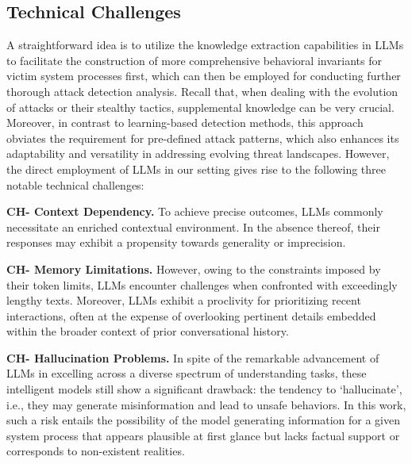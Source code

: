 \subsection{Technical Challenges}\label{sec:challenges}
A straightforward idea is to utilize the knowledge extraction capabilities in LLMs to facilitate the construction of more comprehensive behavioral invariants for victim system processes first, which can then be employed for conducting further thorough attack detection analysis. Recall that,
when dealing with the evolution of attacks or their stealthy tactics, supplemental knowledge can be very crucial. Moreover, in contrast to learning-based detection methods, this approach obviates the requirement for pre-defined attack patterns, which also enhances its adaptability and versatility in addressing evolving threat landscapes.
However, the direct employment of LLMs in our setting gives rise to the following three notable technical challenges:


\noindent
{\bf CH- Context Dependency.} %
To achieve precise outcomes, LLMs commonly necessitate an enriched contextual environment. In the absence thereof, their responses may exhibit a propensity towards generality or imprecision. 

\noindent
{\bf CH- Memory Limitations.} %
However, owing to the constraints imposed by their token limits, LLMs encounter challenges when confronted with exceedingly lengthy texts. Moreover, LLMs exhibit a proclivity for prioritizing recent interactions, often at the expense of overlooking pertinent details embedded within the broader context of prior conversational history.

\noindent
{\bf CH- Hallucination Problems.} %
In spite of the remarkable advancement of LLMs in excelling across a diverse spectrum of understanding tasks, these intelligent models still show a significant drawback: the tendency to `hallucinate', i.e., they may generate misinformation and lead to unsafe behaviors.
In this work, such a risk entails the possibility of the model generating information for a given system process that appears plausible at first glance but lacks factual support or corresponds to non-existent realities.

